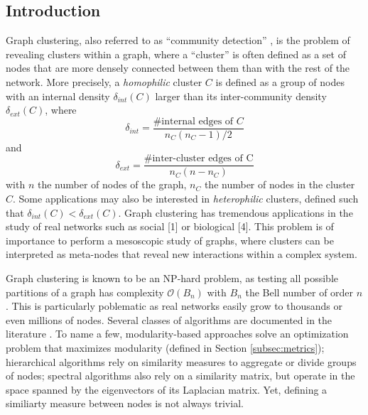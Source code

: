 \documentclass[switch, 12pt]{article}
\renewcommand{\O}{\mathcal{O}}
\begin{document}
\begin{multicols}{2}

    \section{Introduction}

    Graph clustering, also referred to as ``community detection'' \cite{fortunato_community_2010}, is the problem of revealing clusters within a graph, where a ``cluster'' is often defined as a set of nodes that are more densely connected between them than with the rest of the network.
    More precisely, a \emph{homophilic} cluster $C$ is defined as a group of nodes with an internal density $\delta_{int}(C)$ larger than its inter-community density $\delta_{ext}(C)$, where
    \begin{equation}
        \delta_{int} = \frac{\text{\# internal edges of }C}{n_C (n_C - 1) / 2}
    \end{equation}
    and
    \begin{equation}
        \delta_{ext} = \frac{\text{\# inter-cluster edges of C}}{n_C (n - n_C)}
    \end{equation}
    with $n$ the number of nodes of the graph, $n_C$ the number of nodes in the cluster $C$.
    Some applications may also be interested in \emph{heterophilic} clusters, defined such that $\delta_{int}(C) < \delta_{ext}(C)$.
    Graph clustering has tremendous applications in the study of real networks such as
    social [1] or biological [4]. This problem is of importance to perform a mesoscopic study of graphs, where clusters can be interpreted as meta-nodes that reveal new interactions  within a complex system.


    Graph clustering is known to be an NP-hard problem, as testing all possible partitions of a graph has complexity $\O(B_n)$ with $B_n$ the Bell number of order $n$. This is particularly poblematic as real networks easily grow to thousands or even millions of nodes. Several classes of algorithms are documented in the literature \cite{fortunato_community_2010}. To name a few, modularity-based approaches solve an optimization problem that maximizes modularity (defined in Section \ref{subsec:metrics}); hierarchical algorithms rely on similarity measures to aggregate or divide groups of nodes; spectral algorithms also rely on a similarity matrix, but operate in the space spanned by the eigenvectors of its Laplacian matrix. Yet, defining a similiarty measure between nodes is not always trivial.


\end{multicols}
\end{document}
